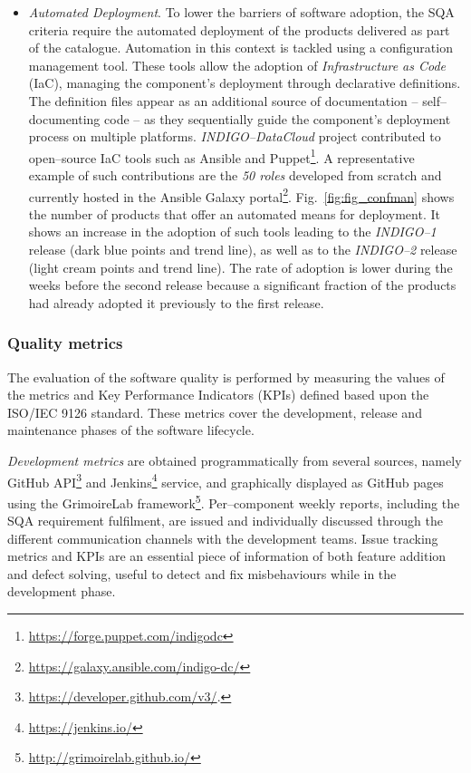 \documentclass[journal]{IEEEtran}
\begin{document}
\begin{itemize}
\item \textit{Automated Deployment}.
To lower the barriers of software adoption, the SQA criteria require the automated
deployment of the products delivered as part of the catalogue. Automation in this context is
tackled using a configuration management tool. These tools allow the adoption of
\textit{Infrastructure as Code} (IaC), managing the component's deployment through declarative
definitions. The definition files appear as an additional source of documentation
-- self--documenting code -- as they sequentially guide the component's deployment process on multiple
platforms. {\sl INDIGO--DataCloud} project contributed to open--source IaC tools such
as Ansible
and Puppet\footnote{\url{https://forge.puppet.com/indigodc}}. A representative example of
such contributions are the \textit{50 roles} developed from scratch and currently hosted in
the Ansible Galaxy portal\footnote{\url{https://galaxy.ansible.com/indigo-dc/}}. Fig.~\ref{fig:fig_confman}
shows the number of products that offer an automated means for deployment.
It shows an increase in the adoption of such tools leading to the {\sl INDIGO--1} release
(dark blue points and trend line), as well as to the {\sl INDIGO--2} release
(light cream points and trend line). The rate of adoption is lower during the weeks
before the second release because a significant fraction of the products had already adopted it
previously to the first release.
\end{itemize}

\subsubsection{Quality metrics}

The evaluation of the software quality is performed by measuring the values of
the metrics and Key Performance Indicators (KPIs) defined based upon the
ISO/IEC 9126 standard. These metrics cover the development, release and
maintenance phases of the software lifecycle.

\textit{Development metrics} are obtained programmatically from several sources, namely GitHub
API\footnote{\url{https://developer.github.com/v3/}.}
and Jenkins\footnote{\url{https://jenkins.io/}} service, and graphically displayed as GitHub
pages using the GrimoireLab framework\footnote{\url{http://grimoirelab.github.io/}}.
Per--component weekly reports, including the SQA requirement
fulfilment, are issued and individually discussed through the different communication channels
with the development teams. Issue tracking metrics and KPIs are an essential piece of information
of both feature addition and defect solving, useful to detect and fix misbehaviours while in the
development phase.
\end{document}
